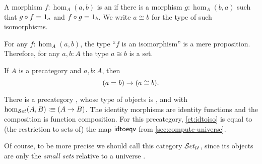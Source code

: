 \documentclass[hott-all.tex]{subfiles}
\begin{document}
\begin{defn}
  A morphism $f:\hom_A(a,b)$ is an 
  if there is a morphism $g:\hom_A(b,a)$ such that $g\circ f =_{} 1_a$ and $f\circ g =_{} 1_b$.
  We write $a\cong b$ for the type of such isomorphisms.
\end{defn}

\begin{lem}
  For any $f:\hom_A(a,b)$, the type ``$f$ is an isomorphism'' is a mere proposition.
  Therefore, for any $a,b:A$ the type $a\cong b$ is a set.
\end{lem}

%

\begin{lem}
  If $A$ is a precategory and $a,b:A$, then
  \[(a =_{} b)\to (a \cong b).\]
\end{lem}


\begin{eg}
  There is a precategory \uset, whose type of objects is \set, and with $\hom_{\mathcal{S}et}(A,B) \vcentcolon\equiv (A\to B)$.
  The identity morphisms are identity functions and the composition is function composition.
  For this precategory, \cref{ct:idtoiso} is equal to (the restriction to sets of) the map $\mathsf{idtoeqv}$ from \cref{sec:compute-universe}.

  Of course, to be more precise we should call this category $\mathcal{S}et_\mathcal{U}$, since its objects are only the \emph{small sets}
  relative to a universe \UU.
\end{eg}
\end{document}
